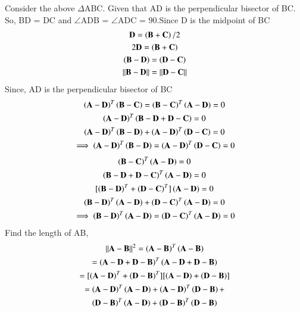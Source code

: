 \begin{figure}[!ht]
\begin{center}
\resizebox{\columnwidth}{!}{}
\end{center}
\caption{}
\label{fig:es17btech11009_fig1}
\end{figure}
Consider the above $\Delta$ABC. Given that AD is the perpendicular bisector of BC. So, BD = DC and $\angle$ADB = $\angle$ADC = 90.Since D is the midpoint of BC
\begin{multline}
    \mathbf{D} = \left(\mathbf{B+C}\right)/2\\
    2\mathbf{D} = \left(\mathbf{B+C}\right)\\
    \left(\mathbf{B-D}\right) = \left(\mathbf{D-C}\right)\\
    \left\lVert\mathbf{B}-\mathbf{D}\right\rVert=\left\lVert\mathbf{D}-\mathbf{C}\right\rVert\label{eq:solutions/1/29/es17btech11009_1}
\end{multline}
Since, AD is the perpendicular bisector of BC
\begin{multline}
    \left(\mathbf{A-D}\right)^T\left(\mathbf{B-C}\right) =\left(\mathbf{B-C}\right)^T\left(\mathbf{A-D}\right) = 0\\
    \left(\mathbf{A-D}\right)^T\left(\mathbf{B-D+D-C}\right) = 0\\
    \left(\mathbf{A-D}\right)^T\left(\mathbf{B-D}\right) + \left(\mathbf{A-D}\right)^T\left(\mathbf{D-C}\right) = 0\\
    \implies\left(\mathbf{A-D}\right)^T\left(\mathbf{B-D}\right)=\left(\mathbf{A-D}\right)^T\left(\mathbf{D-C}\right) = 0\label{eq:solutions/1/29/es17btech11009_2}
\end{multline}
\begin{multline}
    \brak{\vec{B-C}}^T\brak{\vec{A-D}} = 0\\
    \brak{\vec{B-D+D-C}}^T\brak{\vec{A-D}} = 0\\
    [\brak{\vec{B-D}}^T + \brak{\vec{D-C}}^T]\brak{\vec{A-D}} = 0\\
    \brak{\vec{B-D}}^T\brak{\vec{A-D}} + \brak{\vec{D-C}}^T\brak{\vec{A-D}} = 0\\
    \implies\brak{\vec{B-D}}^T\brak{\vec{A-D}}=\brak{\vec{D-C}}^T\brak{\vec{A-D}}= 0\label{eq:solutions/1/29/es17btech11009_3}
\end{multline}
Find the length of AB,
\begin{multline}
 \left\lVert\mathbf{A-B}\right\rVert^2=\left(\mathbf{A-B}\right)^{T}\left(\mathbf{A-B}\right)\\ =\left(\mathbf{A-D+D-B}\right)^{T}\left(\mathbf{A-D+D-B}\right)\\
 = [\left(\mathbf{A-D}\right)^{T}+\left(\mathbf{D-B}\right)^{T}][\left(\mathbf{A-D}\right)+\left(\mathbf{D-B}\right)]\\
 =\left(\mathbf{A-D}\right)^{T}\left(\mathbf{A-D}\right) + \left(\mathbf{A-D}\right)^{T}\left(\mathbf{D-B}\right) +\\ \left(\mathbf{D-B}\right)^{T}\left(\mathbf{A-D}\right) + \left(\mathbf{D-B}\right)^{T}\left(\mathbf{D-B}\right)
\end{multline}
